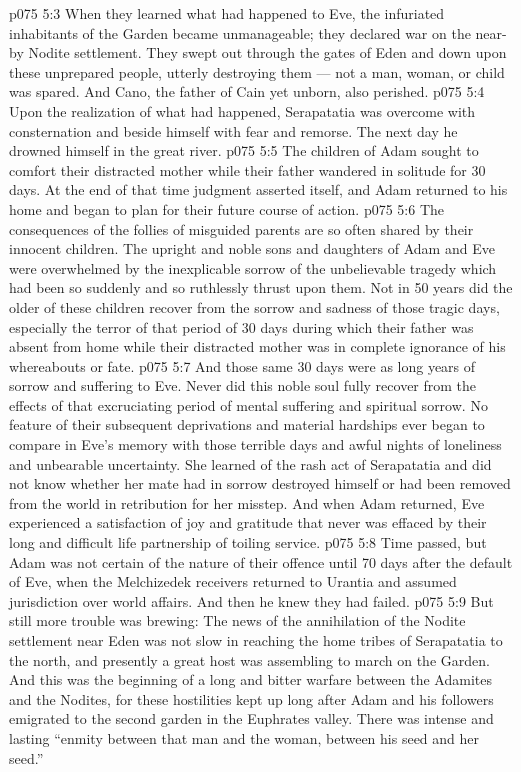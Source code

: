 \vs p075 5:3 When they learned what had happened to Eve, the infuriated inhabitants of the Garden became unmanageable; they declared war on the near\hyp{}by Nodite settlement. They swept out through the gates of Eden and down upon these unprepared people, utterly destroying them --- not a man, woman, or child was spared. And Cano, the father of Cain yet unborn, also perished.
\vs p075 5:4 Upon the realization of what had happened, Serapatatia was overcome with consternation and beside himself with fear and remorse. The next day he drowned himself in the great river.
\vs p075 5:5 The children of Adam sought to comfort their distracted mother while their father wandered in solitude for 30 days. At the end of that time judgment asserted itself, and Adam returned to his home and began to plan for their future course of action.
\vs p075 5:6 The consequences of the follies of misguided parents are so often shared by their innocent children. The upright and noble sons and daughters of Adam and Eve were overwhelmed by the inexplicable sorrow of the unbelievable tragedy which had been so suddenly and so ruthlessly thrust upon them. Not in 50 years did the older of these children recover from the sorrow and sadness of those tragic days, especially the terror of that period of 30 days during which their father was absent from home while their distracted mother was in complete ignorance of his whereabouts or fate.
\vs p075 5:7 And those same 30 days were as long years of sorrow and suffering to Eve. Never did this noble soul fully recover from the effects of that excruciating period of mental suffering and spiritual sorrow. No feature of their subsequent deprivations and material hardships ever began to compare in Eve’s memory with those terrible days and awful nights of loneliness and unbearable uncertainty. She learned of the rash act of Serapatatia and did not know whether her mate had in sorrow destroyed himself or had been removed from the world in retribution for her misstep. And when Adam returned, Eve experienced a satisfaction of joy and gratitude that never was effaced by their long and difficult life partnership of toiling service.
\vs p075 5:8 \pc Time passed, but Adam was not certain of the nature of their offence until 70 days after the default of Eve, when the Melchizedek receivers returned to Urantia and assumed jurisdiction over world affairs. And then he knew they had failed.
\vs p075 5:9 \pc But still more trouble was brewing: The news of the annihilation of the Nodite settlement near Eden was not slow in reaching the home tribes of Serapatatia to the north, and presently a great host was assembling to march on the Garden. And this was the beginning of a long and bitter warfare between the Adamites and the Nodites, for these hostilities kept up long after Adam and his followers emigrated to the second garden in the Euphrates valley. There was intense and lasting “enmity between that man and the woman, between his seed and her seed.”
